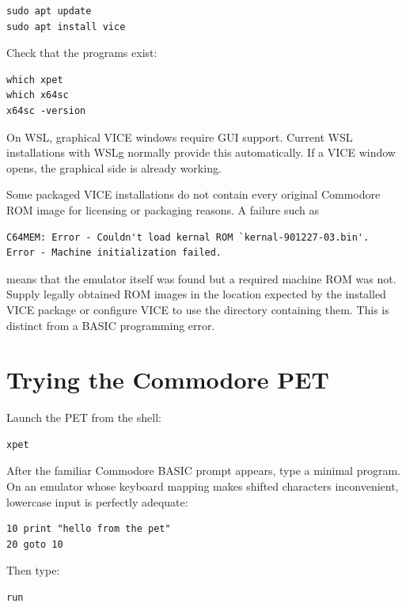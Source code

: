 \documentclass[11pt]{article}
\begin{document}
\begin{lstlisting}[style=shell]
sudo apt update
sudo apt install vice
\end{lstlisting}

Check that the programs exist:

\begin{lstlisting}[style=shell]
which xpet
which x64sc
x64sc -version
\end{lstlisting}

On WSL, graphical VICE windows require GUI support. Current WSL installations with WSLg normally provide this automatically. If a VICE window opens, the graphical side is already working.

Some packaged VICE installations do not contain every original Commodore ROM image for licensing or packaging reasons. A failure such as

\begin{lstlisting}[style=shell]
C64MEM: Error - Couldn't load kernal ROM `kernal-901227-03.bin'.
Error - Machine initialization failed.
\end{lstlisting}

means that the emulator itself was found but a required machine ROM was not. Supply legally obtained ROM images in the location expected by the installed VICE package or configure VICE to use the directory containing them. This is distinct from a BASIC programming error.

\section{Trying the Commodore PET}

Launch the PET from the shell:

\begin{lstlisting}[style=shell]
xpet
\end{lstlisting}

After the familiar Commodore BASIC prompt appears, type a minimal program. On an emulator whose keyboard mapping makes shifted characters inconvenient, lowercase input is perfectly adequate:

\begin{lstlisting}[style=basic]
10 print "hello from the pet"
20 goto 10
\end{lstlisting}

Then type:

\begin{lstlisting}[style=basic]
run
\end{lstlisting}
\end{document}
